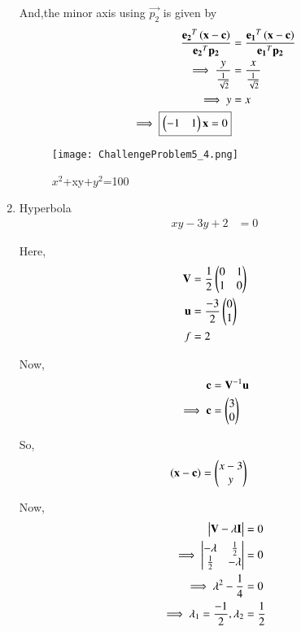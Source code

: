\documentclass[journal,12pt,twocolumn]{IEEEtran}
\begin{document}
\begin{enumerate}
    And,the minor axis using $\vec{p_2}$ is given by
    \begin{align}
        \frac{\mathbf{e_2}^T\left(\mathbf{x}-\mathbf{c}\right)}{{\mathbf{e_2}^T\mathbf{p_2}}} &= \frac{\mathbf{e_1}^T\left(\mathbf{x}-\mathbf{c}\right)}{{\mathbf{e_1}^T\mathbf{p_2}}}\\
        \implies \frac{y}{\frac{1}{\sqrt{2}}} &= \frac{x}{\frac{1}{\sqrt{2}}} \\
        \implies y &= x \\
        \implies \boxed{\begin{pmatrix}-1 & 1\end{pmatrix}\mathbf{x} = 0}
    \end{align}
    
    \begin{figure}[!ht]
    \centering
    \texttt{[image: ChallengeProblem5\_4.png]}
    \caption{$x^2$+xy+$y^2$=100}
    \label{ex4}	
    \end{figure}
    
    \item Hyperbola
    \begin{align}
        xy-3y+2 &= 0
    \end{align}
    
    Here,
    \begin{align}
    \mathbf{V} &= \frac{1}{2}\begin{pmatrix}0 & 1 \\ 1 & 0\end{pmatrix} \\
    \mathbf{u} &= \frac{-3}{2}\begin{pmatrix}0 \\ 1\end{pmatrix} \\
    f &= 2
    \end{align}

    Now,
    \begin{align}
    \mathbf{c} &= \mathbf{V}^{-1}\mathbf{u}\\
    \implies \mathbf{c} &= \begin{pmatrix}3 \\ 0\end{pmatrix}
    \end{align}

    So,
    \begin{align}
    \left(\mathbf{x}-\mathbf{c}\right) &= \begin{pmatrix}x-3 \\ y\end{pmatrix}
    \end{align}

    Now,
    \begin{align}
        \begin{vmatrix}\mathbf{V}-\lambda\mathbf{I}\end{vmatrix} &= 0 \\
        \implies \begin{vmatrix}-\lambda & \frac{1}{2} \\ \frac{1}{2} & -\lambda\end{vmatrix} &= 0 \\
        \implies \lambda^2-\frac{1}{4} &= 0 \\
        \implies \lambda_1 =\frac{-1}{2},\lambda_2 &= \frac{1}{2}
    \end{align}
    

\end{enumerate}
\end{document}
